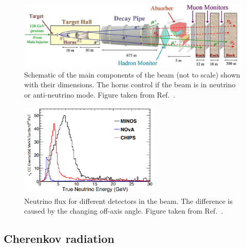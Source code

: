 \begin{figure} %
    \includegraphics[width=\textwidth]{diagrams/4-exp/numi_beam.png}
    \caption[Schematic of the \numi beam.]
    {Schematic of the main components of the \numi beam (not to scale) shown with their
        dimensions. The horns control if the beam is in neutrino or anti-neutrino mode. Figure
        taken from Ref.~\cite{adamson2016}.}
    \label{fig:numi_beam}
\end{figure}

\begin{figure} %
    \includegraphics[width=0.6\textwidth]{diagrams/4-exp/numi_axis.png}
    \caption[Neutrino flux for different detectors in the \numi beam.]
    {Neutrino flux for different detectors in the \numi beam.
        The difference is caused by the changing off-axis angle.
        Figure taken from Ref.~\cite{adamson2013}.}
    \label{fig:numi_axis}
\end{figure}

\subsection{Cherenkov radiation} %
\label{sec:exp_long_cherenkov} %

